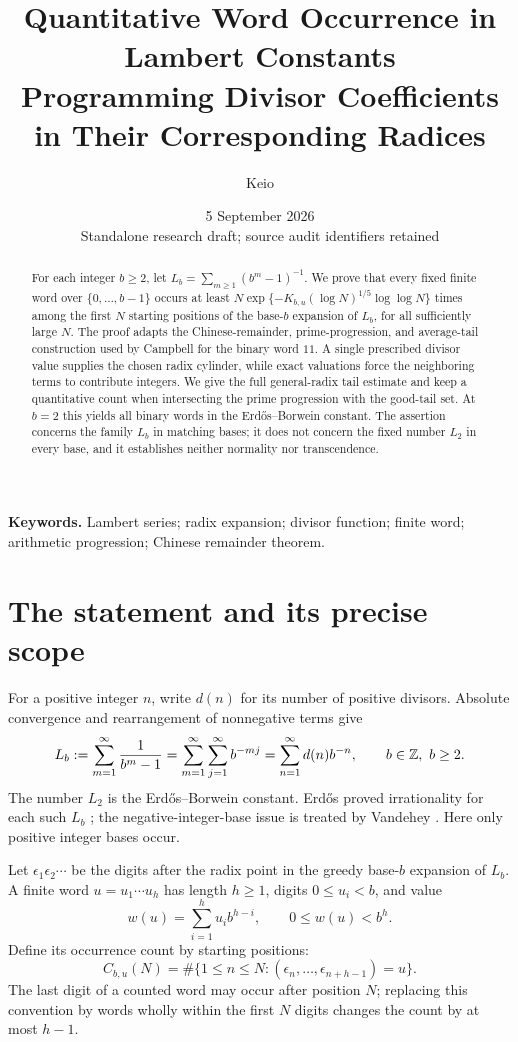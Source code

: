 \documentclass[11pt,a4paper]{article}
\author{Keio}
\date{5 September 2026\\\small Standalone research draft; source audit identifiers retained}
\title{Quantitative Word Occurrence in Lambert Constants\\\large Programming Divisor Coefficients in Their Corresponding Radices}
\theoremstyle{definition}\newtheorem{definition}[theorem]{Definition}
\theoremstyle{remark}\newtheorem{remark}[theorem]{Remark}
\begin{document}
\maketitle
\begin{abstract}
For each integer $b\ge2$, let $L_b=\sum_{m\ge1}(b^m-1)^{-1}$. We prove that every fixed finite word over $\{0,\ldots,b-1\}$ occurs at least $N\exp\{-K_{b,u}(\log N)^{1/5}\log\log N\}$ times among the first $N$ starting positions of the base-$b$ expansion of $L_b$, for all sufficiently large $N$. The proof adapts the Chinese-remainder, prime-progression, and average-tail construction used by Campbell for the binary word $11$. A single prescribed divisor value supplies the chosen radix cylinder, while exact valuations force the neighboring terms to contribute integers. We give the full general-radix tail estimate and keep a quantitative count when intersecting the prime progression with the good-tail set. At $b=2$ this yields all binary words in the Erd\H{o}s--Borwein constant. The assertion concerns the family $L_b$ in matching bases; it does not concern the fixed number $L_2$ in every base, and it establishes neither normality nor transcendence.
\end{abstract}
\noindent\textbf{Keywords.} Lambert series; radix expansion; divisor function; finite word; arithmetic progression; Chinese remainder theorem.

\section{The statement and its precise scope}
For a positive integer $n$, write $d(n)$ for its number of positive divisors. Absolute convergence and rearrangement of nonnegative terms give
\begin{equation}\label{eq:Lambert}
 L_b:=\sum_{m=1}^{\infty}\frac1{b^m-1}
 =\sum_{m=1}^{\infty}\sum_{j=1}^{\infty}b^{-mj}
 =\sum_{n=1}^{\infty}d(n)b^{-n},\qquad b\in\mathbb Z,\ b\ge2.
\end{equation}
The number $L_2$ is the Erd\H{o}s--Borwein constant. Erd\H{o}s proved irrationality for each such $L_b$ \cite{Erdos}; the negative-integer-base issue is treated by Vandehey \cite{Vandehey}. Here only positive integer bases occur.

Let $\epsilon_1\epsilon_2\cdots$ be the digits after the radix point in the greedy base-$b$ expansion of $L_b$. A finite word $u=u_1\cdots u_h$ has length $h\ge1$, digits $0\le u_i<b$, and value
\[
 w(u)=\sum_{i=1}^h u_i b^{h-i},\qquad0\le w(u)<b^h.
\]
Define its occurrence count by starting positions:
\[
 C_{b,u}(N)=\#\{1\le n\le N:(\epsilon_n,\ldots,\epsilon_{n+h-1})=u\}.
\]
The last digit of a counted word may occur after position $N$; replacing this convention by words wholly within the first $N$ digits changes the count by at most $h-1$.
\end{document}
